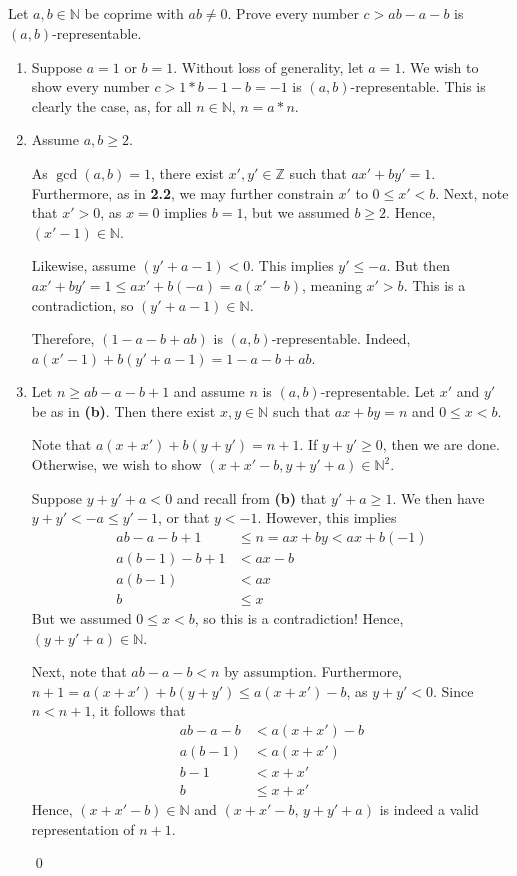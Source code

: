 \documentclass{article}
\newcommand{\N}{\mathbb{N}}
\newcommand{\Z}{\mathbb{Z}}
\begin{document}
\subsection{} %
  Let $a,b\in\N$ be coprime with $ab\ne0$. Prove every number $c>ab-a-b$ is
  $(a,b)$-representable.
  \begin{enumerate}[label=\textbf{(\alph*)}]
    \item{
      Suppose $a=1$ or $b=1$. Without loss of generality, let $a=1$. We wish to
      show every number $c>1*b-1-b=-1$ is $(a,b)$-representable. This is clearly
      the case, as, for all $n\in\N$, $n=a*n$.
    }
    \item{
      Assume $a,b\geq2$.

      As $\gcd(a,b)=1$, there exist $x',y'\in\Z$ such that
      $ax'+by'=1$. Furthermore, as in \textbf{2.2}, we may further constrain
      $x'$ to $0\leq x'<b$. Next, note that $x'>0$, as $x=0$ implies $b=1$, but
      we assumed $b\geq2$. Hence, $(x'-1)\in\N$.

      Likewise, assume $(y'+a-1)<0$. This implies $y'\leq -a$. But then $ax'+by'
      =1\leq ax'+b(-a)=a(x'-b)$, meaning $x'>b$. This is a contradiction, so
      $(y'+a-1)\in\N$.

      Therefore, $(1-a-b+ab)$ is $(a,b)$-representable. Indeed, $a(x'-1)+b(y'+a-
      1)=1-a-b+ab$.
    }
    \item{
      Let $n\geq ab-a-b+1$ and assume $n$ is $(a,b)$-representable. Let $x'$
      and $y'$ be as in \textbf{(b)}. Then there exist $x,y\in\N$ such that $ax+
      by=n$ and $0\leq x<b$.

      Note that $a(x+x')+b(y+y')=n+1$. If $y+y'\geq0$, then we are done.
      Otherwise, we wish to show $(x+x'-b,y+y'+a)\in\N^2$.

      Suppose $y+y'+a<0$ and recall from \textbf{(b)} that $y'+a\geq1$. We then
      have $y+y'<-a\leq y'-1$, or that $y<-1$. However, this implies
      \begin{align*}
          ab-a-b+1   &\leq n = ax+by < ax+b(-1)\\
          a(b-1)-b+1 &< ax-b\\
          a(b-1)     &< ax\\
          b          &\leq x
      \end{align*}
      But we assumed $0\leq x<b$, so this is a contradiction! Hence, $(y+y'+a)
      \in\N$.

      Next, note that $ab-a-b<n$ by assumption. Furthermore, $n+1=a(x+x')+b(y+
      y')\leq a(x+x')-b$, as $y+y'<0$. Since $n<n+1$, it follows that
      \begin{align*}
        ab-a-b   &< a(x+x')-b\\
        a(b-1)   &< a(x+x')\\
        b-1      &< x+x'\\
        b        &\leq x+x'
      \end{align*}
      Hence, $(x+x'-b)\in\N$ and $(x+x'-b,\,y+y'+a)$ is indeed a valid
      representation of $n+1$.
    }
    \qed
  \end{enumerate}
\end{document}
